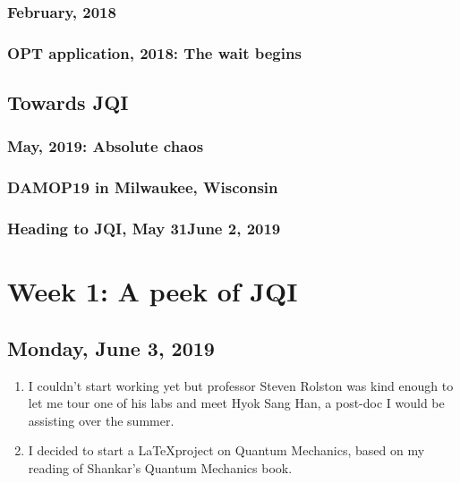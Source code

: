 \documentclass{report}
\theoremstyle{definition}
\begin{document}
\subsection{February, 2018}

\subsection{OPT application, 2018: The wait begins}






\section{Towards JQI}

\subsection{May, 2019: Absolute chaos}

\subsection{DAMOP19 in Milwaukee, Wisconsin}

\subsection{Heading to JQI, May 31\textendash June 2, 2019}


\chapter{Week 1: A peek of JQI}

\section{Monday, June 3, 2019}

\begin{enumerate}
	\item I couldn't start working yet but professor Steven Rolston was kind enough to let me tour one of his labs and meet Hyok Sang Han, a post-doc I would be assisting over the summer.  
	\item I decided to start a \LaTeX project on Quantum Mechanics, based on my reading of Shankar's Quantum Mechanics book. 
\end{enumerate}
\end{document}
